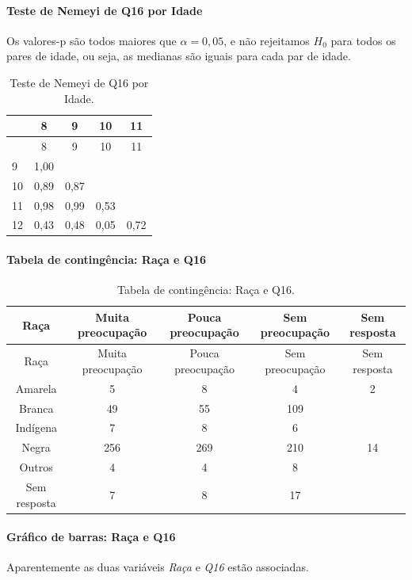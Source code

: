 \documentclass[]{article}
\let\oldparagraph\paragraph
\renewcommand{\paragraph}[1]{\oldparagraph{#1}\mbox{}}
\begin{document}
\hypertarget{teste-de-nemeyi-de-q16-por-idade}{%
\paragraph{Teste de Nemeyi de Q16 por Idade}\label{teste-de-nemeyi-de-q16-por-idade}}

Os valores-p são todos maiores que \(\alpha=0,05\), e não rejeitamos \(H_0\) para todos os pares de idade, ou seja, as medianas são iguais para cada par de idade.

\begin{longtable}[]{@{}lcccc@{}}
\caption{\label{tab:unnamed-chunk-156}Teste de Nemeyi de Q16 por Idade.}\tabularnewline
\toprule
& 8 & 9 & 10 & 11\tabularnewline
\midrule
\endfirsthead
\toprule
& 8 & 9 & 10 & 11\tabularnewline
\midrule
\endhead
9 & 1,00 & & &\tabularnewline
10 & 0,89 & 0,87 & &\tabularnewline
11 & 0,98 & 0,99 & 0,53 &\tabularnewline
12 & 0,43 & 0,48 & 0,05 & 0,72\tabularnewline
\bottomrule
\end{longtable}

\cleardoublepage

\hypertarget{tabela-de-continguxeancia-rauxe7a-e-q16}{%
\paragraph{Tabela de contingência: Raça e Q16}\label{tabela-de-continguxeancia-rauxe7a-e-q16}}

\begin{longtable}[]{@{}ccccc@{}}
\caption{\label{tab:unnamed-chunk-157}Tabela de contingência: Raça e Q16.}\tabularnewline
\toprule
Raça & Muita preocupação & Pouca preocupação & Sem preocupação & Sem resposta\tabularnewline
\midrule
\endfirsthead
\toprule
Raça & Muita preocupação & Pouca preocupação & Sem preocupação & Sem resposta\tabularnewline
\midrule
\endhead
Amarela & 5 & 8 & 4 & 2\tabularnewline
Branca & 49 & 55 & 109 &\tabularnewline
Indígena & 7 & 8 & 6 &\tabularnewline
Negra & 256 & 269 & 210 & 14\tabularnewline
Outros & 4 & 4 & 8 &\tabularnewline
Sem resposta & 7 & 8 & 17 &\tabularnewline
\bottomrule
\end{longtable}

\hypertarget{gruxe1fico-de-barras-rauxe7a-e-q16}{%
\paragraph{Gráfico de barras: Raça e Q16}\label{gruxe1fico-de-barras-rauxe7a-e-q16}}

Aparentemente as duas variáveis \emph{Raça} e \emph{Q16} estão associadas.
\end{document}
